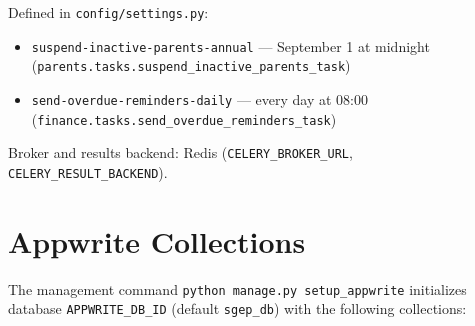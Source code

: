 \documentclass[11pt,a4paper]{article}
\begin{document}
Defined in \texttt{config/settings.py}:

\begin{itemize}[noitemsep]
    \item \texttt{suspend-inactive-parents-annual} --- September 1 at midnight (\texttt{parents.tasks.suspend\_inactive\_parents\_task})
    \item \texttt{send-overdue-reminders-daily} --- every day at 08:00 (\texttt{finance.tasks.send\_overdue\_reminders\_task})
\end{itemize}

Broker and results backend: Redis (\texttt{CELERY\_BROKER\_URL}, \texttt{CELERY\_RESULT\_BACKEND}).

\section{Appwrite Collections}

The management command \texttt{python manage.py setup\_appwrite} initializes database \texttt{APPWRITE\_DB\_ID} (default \texttt{sgep\_db}) with the following collections:
\end{document}
